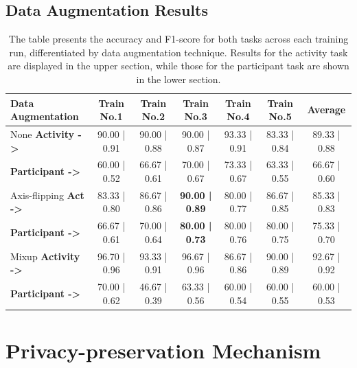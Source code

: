 \documentclass{l4proj}
\begin{document}
\begin{appendices}
\subsection{Data Augmentation Results}
\begin{table}[ht]
    \centering
    \begin{tabular}{|l|c|c|c|c|c|c|}
        \hline
        \rowcolor{lightgray}
        \textbf{Data Augmentation} & \textbf{Train No.1} & \textbf{Train No.2} & \textbf{Train No.3} & \textbf{Train No.4} & \textbf{Train No.5} & \textbf{Average} \\
        \hline
        None \hspace{5mm} \textbf{Activity ->} & 90.00 | 0.91 & 90.00 | 0.88 & 90.00 | 0.87 & 93.33 | 0.91 & 83.33 | 0.84 & 89.33 | 0.88 \\ 
        \hspace{10mm} \textbf{Participant ->} & 60.00 | 0.52 & 66.67 | 0.61 & 70.00 | 0.67 & 73.33 | 0.67 & 63.33 | 0.55 & 66.67 | 0.60 \\
        \hline
        Axis-flipping \hspace{1.5mm} \textbf{Act ->}& 83.33 | 0.80 & 86.67 | 0.86 & \textbf{90.00 | 0.89} & 80.00 | 0.77 & 86.67 | 0.85 & 85.33 | 0.83 \\
        \hspace{10mm} \textbf{Participant ->} & 66.67 | 0.61 & 70.00 | 0.64 & \textbf{80.00 | 0.73} & 80.00 | 0.76 & 80.00 | 0.75 & 75.33 | 0.70 \\
        \hline
        Mixup \hspace{3.8mm} \textbf{Activity ->} & 96.70 | 0.96 & 93.33 | 0.91 & 96.67 | 0.96 & 86.67 | 0.86 & 90.00 | 0.89 & 92.67 | 0.92 \\
        \hspace{10mm} \textbf{Participant ->} & 70.00 | 0.62 & 46.67 | 0.39 & 63.33 | 0.56 & 60.00 | 0.54 & 60.00 | 0.55 & 60.00 | 0.53 \\
        \hline
    \end{tabular}
    \caption{ The table presents the accuracy and F1-score for both tasks across each training run, differentiated by data augmentation technique. Results for the activity task are displayed in the upper section, while those for the participant task are shown in the lower section.}
    \label{tab:multitask-data-augmentations-evaluation}
\end{table}

\newpage

\section{Privacy-preservation Mechanism}

\end{appendices}
\end{document}
